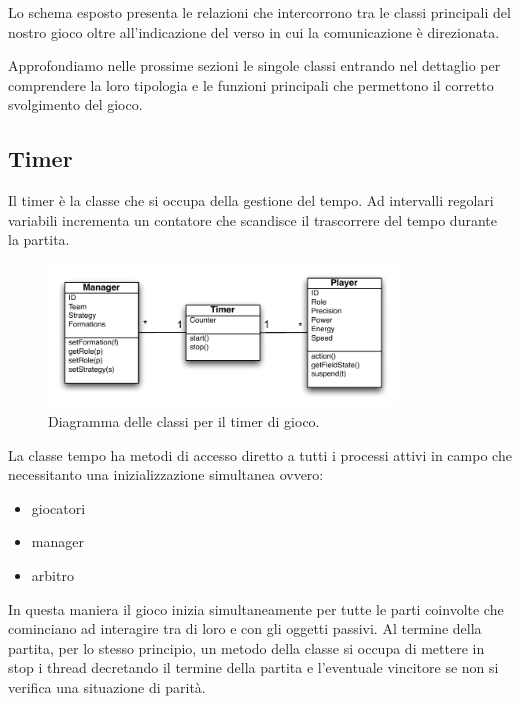 \documentclass[aps,letterpaper,10pt]{article}
\begin{document}
Lo schema esposto presenta le relazioni che intercorrono tra le classi principali del nostro gioco oltre all'indicazione del verso in cui la comunicazione \`e direzionata. \vspace{3mm}

Approfondiamo nelle prossime sezioni le singole classi entrando nel dettaglio per comprendere la loro tipologia e le funzioni principali che permettono il corretto svolgimento del gioco.

\subsection{Timer}

Il timer \`e la classe che si occupa della gestione del tempo. Ad intervalli regolari variabili incrementa un contatore che scandisce il trascorrere del tempo durante la partita. 

\begin{figure}[H]
	\begin{center}
		\includegraphics[width=350px]{images/timer-class.pdf}
	\end{center}
\caption{Diagramma delle classi per il timer di gioco.}
\end{figure}

La classe tempo ha metodi di accesso diretto a tutti i processi attivi in campo che necessitanto una inizializzazione simultanea ovvero:

\begin{itemize}
	\item giocatori
	\item manager
	\item arbitro
\end{itemize}

In questa maniera il gioco inizia simultaneamente per tutte le parti coinvolte che cominciano ad interagire tra di loro e con gli oggetti passivi. Al termine della partita, per lo stesso principio, un metodo della classe si occupa di mettere in stop i thread decretando il termine della partita e l'eventuale vincitore se non si verifica una situazione di parit\`a.
\end{document}
